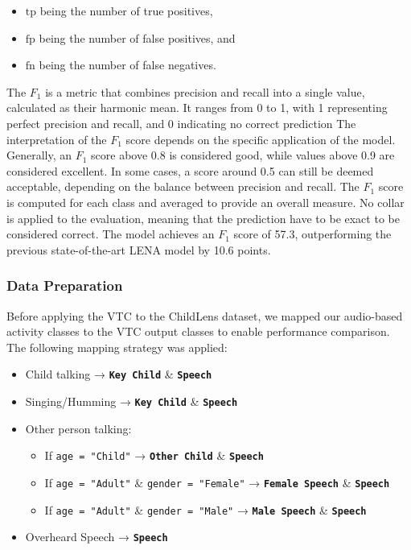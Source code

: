 \documentclass[
  man,floatsintext]{apa6}
\providecommand{\tightlist}{%
  \setlength{\itemsep}{0pt}\setlength{\parskip}{0pt}}
\begin{document}
\begin{itemize}
\tightlist
\item
  \(\text{tp}\) being the number of true positives,
\item
  \(\text{fp}\) being the number of false positives, and
\item
  \(\text{fn}\) being the number of false negatives.
\end{itemize}

The \(F_1\) is a metric that combines precision and recall into a single value, calculated as their harmonic mean. It ranges from 0 to 1, with 1 representing perfect precision and recall, and 0 indicating no correct prediction The interpretation of the \(F_1\) score depends on the specific application of the model. Generally, an \(F_1\) score above 0.8 is considered good, while values above 0.9 are considered excellent. In some cases, a score around 0.5 can still be deemed acceptable, depending on the balance between precision and recall. The \(F_1\) score is computed for each class and averaged to provide an overall measure. No collar is applied to the evaluation, meaning that the prediction have to be exact to be considered correct. The model achieves an \(F_1\) score of 57.3, outperforming the previous state-of-the-art LENA model by 10.6 points.

\subsubsection{Data Preparation}\label{data-preparation-1}

Before applying the VTC to the ChildLens dataset, we mapped our audio-based activity classes to the VTC output classes to enable performance comparison. The following mapping strategy was applied:

\begin{itemize}
\tightlist
\item
  Child talking → \textbf{\texttt{Key\ Child}} \& \textbf{\texttt{Speech}}
\item
  Singing/Humming → \textbf{\texttt{Key\ Child}} \& \textbf{\texttt{Speech}}
\item
  Other person talking:

  \begin{itemize}
  \tightlist
  \item
    If \texttt{age\ =\ "Child"} → \textbf{\texttt{Other\ Child}} \& \textbf{\texttt{Speech}}
  \item
    If \texttt{age\ =\ "Adult"} \& \texttt{gender\ =\ "Female"} → \textbf{\texttt{Female\ Speech}} \& \textbf{\texttt{Speech}}
  \item
    If \texttt{age\ =\ "Adult"} \& \texttt{gender\ =\ "Male"} → \textbf{\texttt{Male\ Speech}} \& \textbf{\texttt{Speech}}
  \end{itemize}
\item
  Overheard Speech → \textbf{\texttt{Speech}}
\end{itemize}
\end{document}
